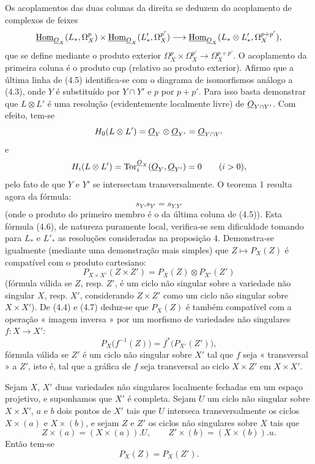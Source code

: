Os acoplamentos das duas colunas da direita se deduzem do acoplamento de
complexos de feixes
\[
\underline{\operatorname{Hom}}_{\underline{O}_X}(L_{*},\Omega_X^{p})
\times\underline{\operatorname{Hom}}_{\underline{O}_X}(L'_{*},\Omega_X^{p'})
\longrightarrow
\underline{\operatorname{Hom}}_{\underline{O}_X}(L_{*}\otimes L'_{*},\Omega_X^{p+p'}),
\]
que se define mediante o produto exterior
$\Omega_X^{p}\times\Omega_X^{p'}\longrightarrow\Omega_X^{p+p'}$.
O acoplamento da primeira coluna é o produto cup (relativo ao produto
exterior). Afirmo que a última linha de (4.5) identifica-se com o diagrama
de isomorfismos análogo a (4.3), onde $Y$ é substituído por $Y\cap Y'$ e $p$ por
$p+p'$. Para isso basta demonstrar que $L\otimes L'$ é uma resolução
(evidentemente localmente livre) de $\underline{O}_{Y\cap Y'}$. Com efeito, tem-se
\[
  H_0(L\otimes L')=\underline{O}_Y\otimes\underline{O}_{Y'}=\underline{O}_{Y\cap Y'}
\]
e
\[
  H_i(L\otimes L')=\operatorname{Tor}_{i}^{\underline{O}_X}(\underline{O}_Y,\underline{O}_{Y'})=0
  \qquad(i>0),
\]
pelo fato de que $Y$ e $Y'$ se intersectam transversalmente. O teorema 1 resulta
agora da fórmula:
\begin{equation}\tag{4.6}
  s_Y.s_{Y'}=s_{Y.Y'}
\end{equation}
(onde o produto do primeiro membro é o da última coluna de (4.5)).
Esta fórmula (4.6), de natureza puramente local, verifica-se sem dificuldade
tomando para $L_{*}$ e $L'_{*}$ as resoluções consideradas na proposição
4. Demonstra-se igualmente (mediante uma demonstração mais simples) que
$Z\longmapsto P_X(Z)$ é compatível com o produto cartesiano:
\begin{equation}\tag{4.7}
  P_{X\times X'}(Z\times Z')=P_X(Z)\otimes P_{X'}(Z')
\end{equation}
(fórmula válida se $Z$, resp. $Z'$, é um ciclo não singular sobre a variedade
não singular $X$, resp. $X'$, considerando $Z\times Z'$ como um ciclo não
singular sobre $X\times X'$). De (4.4) e (4.7) deduz-se que $P_X(Z)$ é também
compatível com a operação « imagem inversa » por um morfismo de variedades não
singulares $f:X\longrightarrow X'$:
\begin{equation}\tag{4.8}
  P_X\bigl(f^{-1}(Z)\bigr)=f^{*}\bigl(P_{X'}(Z')\bigr),
\end{equation}
fórmula válida se $Z'$ é um ciclo não singular sobre $X'$ tal que $f$ seja
« transversal » a $Z'$, isto é, tal que a gráfica de $f$ seja transversal ao ciclo
$X\times Z'$ em $X\times X'$.

 Sejam $X$, $X'$ duas variedades não singulares
localmente fechadas em um espaço projetivo, e suponhamos que $X'$ é completa. Sejam $U$
um ciclo não singular sobre $X\times X'$, $a$ e $b$ dois pontos de $X'$ tais que
$U$ interseca transversalmente os ciclos $X\times(a)$ e $X\times(b)$, e sejam $Z$
e $Z'$ os ciclos não singulares sobre $X$ tais que
\[
  Z\times(a)=(X\times(a)).U,
  \qquad
  Z'\times(b)=(X\times(b)).u.
\]
Então tem-se
\[
  P_X(Z)=P_X(Z').
\]

